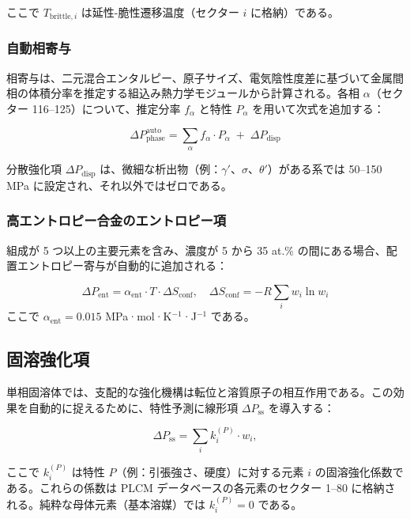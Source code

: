\documentclass[11pt,a4paper]{article}
\theoremstyle{remark}
\begin{document}
	ここで \(T_{\text{brittle},i}\) は延性-脆性遷移温度（セクター \(i\) に格納）である。
	
	\subsubsection{自動相寄与}
	相寄与は、二元混合エンタルピー、原子サイズ、電気陰性度差に基づいて金属間相の体積分率を推定する組込み熱力学モジュールから計算される。各相 \(\alpha\)（セクター 116–125）について、推定分率 \(f_{\alpha}\) と特性 \(P_{\alpha}\) を用いて次式を追加する：
	
	\begin{equation}
		\Delta P_{\text{phase}}^{\text{auto}} = \sum_{\alpha} f_{\alpha} \cdot P_{\alpha} \;+\; \Delta P_{\text{disp}}
	\end{equation}
	
	分散強化項 \(\Delta P_{\text{disp}}\) は、微細な析出物（例：\(\gamma'\)、\(\sigma\)、\(\theta'\)）がある系では 50–150 MPa に設定され、それ以外ではゼロである。
	
	\subsubsection{高エントロピー合金のエントロピー項}
	組成が 5 つ以上の主要元素を含み、濃度が 5 から 35 at.\% の間にある場合、配置エントロピー寄与が自動的に追加される：
	
	\begin{equation}
		\Delta P_{\text{ent}} = \alpha_{\text{ent}} \cdot T \cdot \Delta S_{\text{conf}}, \quad
		\Delta S_{\text{conf}} = -R \sum_i w_i \ln w_i
	\end{equation}
	ここで \(\alpha_{\text{ent}} = 0.015\) MPa·mol·K\(^{-1}\)·J\(^{-1}\) である。
	
	\subsection{固溶強化項}
	\label{subsec:ss-term}
	
	単相固溶体では、支配的な強化機構は転位と溶質原子の相互作用である。この効果を自動的に捉えるために、特性予測に線形項 \(\Delta P_{\text{ss}}\) を導入する：
	
	\begin{equation}
		\Delta P_{\text{ss}} = \sum_i k_i^{(P)} \cdot w_i,
		\label{eq:ss-term}
	\end{equation}
	
	ここで \(k_i^{(P)}\) は特性 \(P\)（例：引張強さ、硬度）に対する元素 \(i\) の固溶強化係数である。これらの係数は PLCM データベースの各元素のセクター 1–80 に格納される。純粋な母体元素（基本溶媒）では \(k_i^{(P)} = 0\) である。
	
\end{document}
